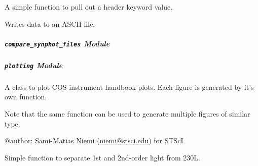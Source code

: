 \documentclass[letterpaper,10pt,english]{sphinxmanual}
\begin{document}
\begin{fulllineitems}

\begin{fulllineitems}
\label{SamPy.plot.COSIHB:SamPy.plot.COSIHB.IO.COSHBIO.HeaderKeyword}
A simple function to pull out a header keyword value.

\end{fulllineitems}



\begin{fulllineitems}
\label{SamPy.plot.COSIHB:SamPy.plot.COSIHB.IO.COSHBIO.writeToASCIIFile}
Writes data to an ASCII file.

\end{fulllineitems}


\end{fulllineitems}



\subparagraph{\texttt{compare\_synphot\_files} Module}
\label{SamPy.plot.COSIHB:compare-synphot-files-module}\label{SamPy.plot.COSIHB:module-SamPy.plot.COSIHB.compare_synphot_files}

\subparagraph{\texttt{plotting} Module}
\label{SamPy.plot.COSIHB:plotting-module}\label{SamPy.plot.COSIHB:module-SamPy.plot.COSIHB.plotting}
A class to plot COS instrument handbook plots. Each figure 
is generated by it's own function.

Note that the same function can be used to generate multiple
figures of similar type.

@author: Sami-Matias Niemi (\href{mailto:niemi@stsci.edu}{niemi@stsci.edu}) for STScI


\begin{fulllineitems}
\label{SamPy.plot.COSIHB:SamPy.plot.COSIHB.plotting.Fix}
Simple function to separate 1st and 2nd-order light from 230L.

\end{fulllineitems}
\end{document}
